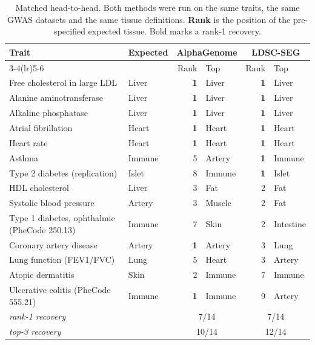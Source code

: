 \begin{table}[htbp]\centering\small
\caption{Matched head-to-head. Both methods were run on the same \NMATCH{} traits, the same GWAS datasets and the same \NTISSUE{} tissue definitions. \textbf{Rank} is the position of the pre-specified expected tissue. Bold marks a rank-1 recovery.}\label{tab:ldsc}
\begin{tabular}{llrlrl}\toprule
Trait & Expected & \multicolumn{2}{c}{AlphaGenome} & \multicolumn{2}{c}{LDSC-SEG} \\
\cmidrule(lr){3-4}\cmidrule(lr){5-6}
 & & Rank & Top & Rank & Top \\ \midrule
Free cholesterol in large LDL & Liver & \textbf{1} & Liver & \textbf{1} & Liver \\
Alanine aminotransferase & Liver & \textbf{1} & Liver & \textbf{1} & Liver \\
Alkaline phosphatase & Liver & \textbf{1} & Liver & \textbf{1} & Liver \\
Atrial fibrillation & Heart & \textbf{1} & Heart & \textbf{1} & Heart \\
Heart rate & Heart & \textbf{1} & Heart & \textbf{1} & Heart \\
Asthma & Immune & 5 & Artery & \textbf{1} & Immune \\
Type 2 diabetes (replication) & Islet & 8 & Immune & \textbf{1} & Islet \\
HDL cholesterol & Liver & 3 & Fat & 2 & Fat \\
Systolic blood pressure & Artery & 3 & Muscle & 2 & Fat \\
Type 1 diabetes, ophthalmic (PheCode 250.13) & Immune & 7 & Skin & 2 & Intestine \\
Coronary artery disease & Artery & \textbf{1} & Artery & 3 & Lung \\
Lung function (FEV1/FVC) & Lung & 5 & Heart & 3 & Artery \\
Atopic dermatitis & Skin & 2 & Immune & 7 & Immune \\
Ulcerative colitis (PheCode 555.21) & Immune & \textbf{1} & Immune & 9 & Artery \\
\midrule
\multicolumn{2}{l}{\emph{rank-1 recovery}} & \multicolumn{2}{c}{7/14} & \multicolumn{2}{c}{7/14} \\
\multicolumn{2}{l}{\emph{top-3 recovery}} & \multicolumn{2}{c}{10/14} & \multicolumn{2}{c}{12/14} \\
\bottomrule\end{tabular}\end{table}